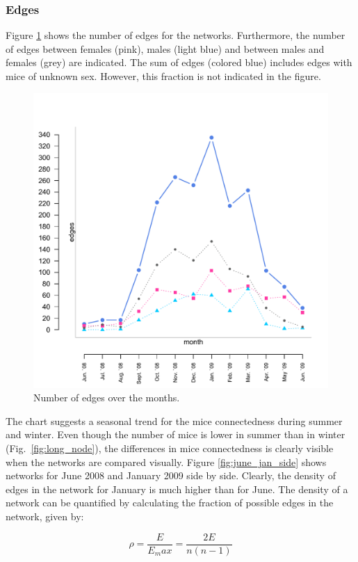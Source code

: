 \subsubsection{Edges}

Figure \ref{fig:long_edges} shows the number of edges for the networks. Furthermore, the number of edges between females (pink), males (light blue) and between males and females (grey) are indicated. The sum of edges (colored blue) includes edges with mice of unknown sex. However, this fraction is not indicated in the figure.

\begin{figure}[htpb]
\begin{center}
  \includegraphics[width=.6\textwidth]{assets/pdf/long_edges.pdf}
  \caption[Number of edges over the months]{Number of edges over the months.}
  \label{fig:long_edges}
\end{center}
\end{figure}

The chart suggests a seasonal trend for the mice connectedness during summer and winter. Even though the number of mice is lower in summer than in winter (Fig.~\ref{fig:long_node}), the differences in mice connectedness is clearly visible when the networks are compared visually. Figure \ref{fig:june_jan_side} shows networks for June 2008 and January 2009 side by side. Clearly, the density of edges in the network for January is much higher than for June. The density of a network can be quantified by calculating the fraction of possible edges in the network, given by:  

\begin{equation}
\rho = \frac{E}{E_max} = \frac{2E}{n(n-1)}
\label{eq:density}
\end{equation}      

